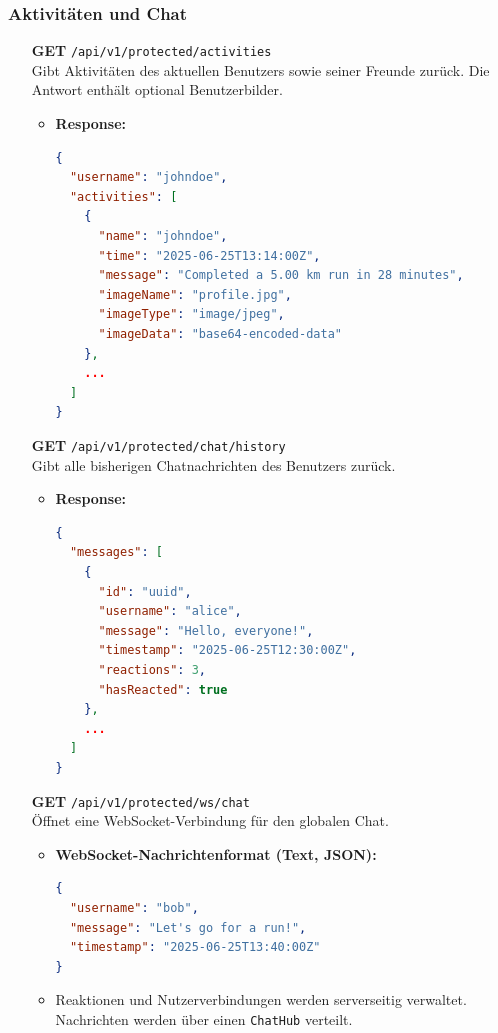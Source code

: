 \documentclass[11pt,a4paper]{article}
\begin{document}
\subsubsection{Aktivitäten und Chat}

\begin{itemize}[leftmargin=1.5cm]

  \item[\textbf{GET}] \texttt{/api/v1/protected/activities} \\
  Gibt Aktivitäten des aktuellen Benutzers sowie seiner Freunde zurück. Die Antwort enthält optional Benutzerbilder.

  \begin{itemize}
    \item \textbf{Response:}
\begin{lstlisting}[language=json]
{
  "username": "johndoe",
  "activities": [
    {
      "name": "johndoe",
      "time": "2025-06-25T13:14:00Z",
      "message": "Completed a 5.00 km run in 28 minutes",
      "imageName": "profile.jpg",
      "imageType": "image/jpeg",
      "imageData": "base64-encoded-data"
    },
    ...
  ]
}
\end{lstlisting}
  \end{itemize}

  \item[\textbf{GET}] \texttt{/api/v1/protected/chat/history} \\
  Gibt alle bisherigen Chatnachrichten des Benutzers zurück.

  \begin{itemize}
    \item \textbf{Response:}
\begin{lstlisting}[language=json]
{
  "messages": [
    {
      "id": "uuid",
      "username": "alice",
      "message": "Hello, everyone!",
      "timestamp": "2025-06-25T12:30:00Z",
      "reactions": 3,
      "hasReacted": true
    },
    ...
  ]
}
\end{lstlisting}
  \end{itemize}

  \item[\textbf{GET}] \texttt{/api/v1/protected/ws/chat} \\
  Öffnet eine WebSocket-Verbindung für den globalen Chat.

  \begin{itemize}
    \item \textbf{WebSocket-Nachrichtenformat (Text, JSON):}
\begin{lstlisting}[language=json]
{
  "username": "bob",
  "message": "Let's go for a run!",
  "timestamp": "2025-06-25T13:40:00Z"
}
\end{lstlisting}
    \item Reaktionen und Nutzerverbindungen werden serverseitig verwaltet. Nachrichten werden über einen \texttt{ChatHub} verteilt.
  \end{itemize}

\end{itemize}
\end{document}

